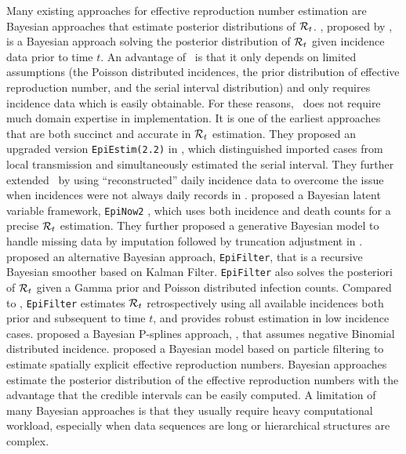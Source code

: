 Many existing approaches for effective reproduction number estimation are Bayesian approaches that estimate posterior distributions of $\mathcal{R}_t$. \EpiEstim \citep{cori2020package}, proposed by \cite{cori2013new}, is a Bayesian approach solving the posterior distribution of $\mathcal{R}_t$ given incidence data prior to time $t$. An advantage of \EpiEstim\ is that it only depends on limited assumptions (the Poisson distributed incidences, the prior distribution of effective reproduction number, and the serial interval distribution) and only requires incidence data which is easily obtainable. For these reasons, \EpiEstim\ does not require much domain expertise in implementation. It is one of the earliest approaches that are both succinct and accurate in $\mathcal{R}_t$ estimation. They proposed an upgraded version \texttt{EpiEstim(2.2)} in \cite{thompson2019improved}, which distinguished imported cases from local transmission and simultaneously estimated the serial interval. They further extended \EpiEstim\ by using ``reconstructed'' daily incidence data to overcome the issue when incidences were not always daily records in \cite{nash2023estimating}. 
% 
\cite{abbott2020estimating} proposed a Bayesian latent variable framework, \texttt{EpiNow2} \citep{EpiNow2}, which uses both incidence and death counts for a precise $\mathcal{R}_t$ estimation. They further proposed a generative Bayesian model to handle missing data by imputation followed by truncation adjustment in \cite{lison2023generative}. 
%
\cite{parag2021improved} proposed an alternative Bayesian approach, \texttt{EpiFilter}, that is a recursive Bayesian smoother based on Kalman Filter. \texttt{EpiFilter} also solves the posteriori of $\mathcal{R}_t$ given a Gamma prior and Poisson distributed infection counts. Compared to \EpiEstim, \texttt{EpiFilter} estimates $\mathcal{R}_t$ retrospectively using all available incidences both prior and subsequent to time $t$, and provides robust estimation in low incidence cases.  
\cite{gressani2022epilps} proposed a Bayesian P-splines approach, \EpiLPS, that assumes negative Binomial distributed incidence. 
\cite{trevisin2023spatially} proposed a Bayesian model based on particle filtering to estimate spatially explicit effective reproduction numbers.
%
Bayesian approaches estimate the posterior distribution of the effective reproduction numbers with the advantage that the credible intervals can be easily computed. A limitation of many Bayesian approaches is that they usually require heavy computational workload, especially when data sequences are long or hierarchical structures are complex.  %

